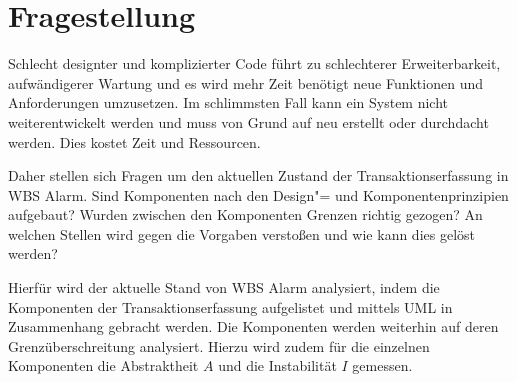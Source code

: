 \chapter{Fragestellung}
\label{ch:Fragestellung}

Schlecht designter und komplizierter Code führt zu schlechterer Erweiterbarkeit, aufwändigerer Wartung und es wird mehr Zeit benötigt neue Funktionen und Anforderungen umzusetzen. Im schlimmsten Fall kann ein System nicht weiterentwickelt werden und muss von Grund auf neu erstellt oder durchdacht werden. Dies kostet Zeit und Ressourcen.

Daher stellen sich Fragen um den aktuellen Zustand der Transaktionserfassung in WBS Alarm. Sind Komponenten nach den \oge Design"= und Komponentenprinzipien aufgebaut? Wurden zwischen den Komponenten Grenzen richtig gezogen? An welchen Stellen wird gegen die Vorgaben verstoßen und wie kann dies gelöst werden?

Hierfür wird der aktuelle Stand von WBS Alarm analysiert, indem die Komponenten \bzgl der Transaktionserfassung aufgelistet und mittels UML in Zusammenhang gebracht werden. Die Komponenten werden weiterhin auf deren Grenzüberschreitung analysiert. Hierzu wird zudem für die einzelnen Komponenten die Abstraktheit $A$ und die Instabilität $I$ gemessen.

